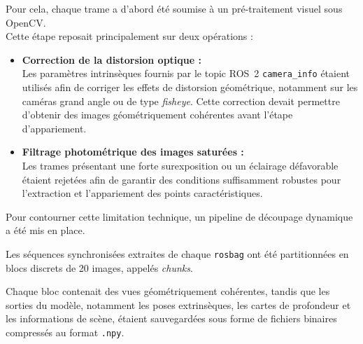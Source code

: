 \documentclass[12pt,a4paper,oneside]{report}
\begin{document}
\hspace*{0.3cm}Pour cela, chaque trame a d'abord  été soumise à un pré-traitement visuel sous OpenCV.\\
Cette étape reposait principalement sur deux opérations : \vspace{0.3cm}

\begin{itemize}[itemsep=0.5em, label=\textbullet]

    \item \textbf{Correction de la distorsion optique :}\\
    \hspace*{0.5cm}Les paramètres intrinsèques fournis par le topic ROS~2 \texttt{camera\_info} étaient utilisés afin de corriger les effets de distorsion géométrique, notamment sur les caméras grand angle ou de type \textit{fisheye}. Cette correction devait permettre d'obtenir des images géométriquement cohérentes avant l'étape d'appariement.

    \vspace{0.5cm}

    \item \textbf{Filtrage photométrique des images saturées :}\\
    \hspace*{0.5cm}Les trames présentant une forte surexposition ou un éclairage défavorable étaient rejetées afin de garantir des conditions suffisamment robustes pour l'extraction et l'appariement des points caractéristiques.

\end{itemize}

\vspace{1cm}

\hspace*{1cm}Pour contourner cette limitation technique, un pipeline de découpage dynamique a été mis en place.\vspace{0.05cm}

\hspace*{0.5cm}Les séquences synchronisées extraites de chaque \texttt{rosbag} ont été partitionnées en blocs discrets de 20 images, appelés \textit{chunks}.\vspace{0.2cm}

\hspace*{1cm}Chaque bloc contenait des vues géométriquement cohérentes, tandis que les sorties du modèle, notamment les poses extrinsèques, les cartes de profondeur et les informations de scène, étaient sauvegardées sous forme de fichiers binaires compressés au format \texttt{.npy}.\\
\end{document}
